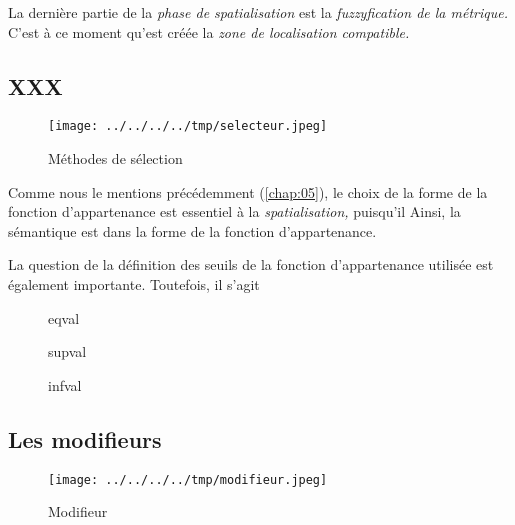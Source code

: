 La dernière partie de la \emph{phase de spatialisation} est la
\emph{fuzzyfication de la métrique.} C'est à ce moment qu'est créée la
\emph{zone de localisation compatible.}

\subsection{XXX}

\begin{figure}
  \centering
  \texttt{[image: ../../../../tmp/selecteur.jpeg]}
  \caption{Méthodes de sélection}
  \label{fig:methode_selecteur}
\end{figure}



%
Comme nous le mentions précédemment (\autoref{chap:05}), le choix de la forme de la fonction d'appartenance est essentiel à la \emph{spatialisation,} puisqu'il
%
Ainsi, la sémantique est dans la forme de la fonction d'appartenance.

%
La question de la définition des seuils de la fonction d'appartenance utilisée est également importante. Toutefois, il s'agit 


\begin{figure}
  \centering
  
  \caption{eqval}
  \label{fig:select_eqval}
\end{figure}


\begin{figure}
  \centering
  
  \caption{supval}
  \label{fig:select_supval}
\end{figure}


\begin{figure}
  \centering
  
  \caption{infval}
  \label{fig:select_infval}
\end{figure}

\subsection{Les modifieurs}



\begin{figure}
  \centering
  \texttt{[image: ../../../../tmp/modifieur.jpeg]}
  \caption{Modifieur}
  \label{fig:methode_modifieur}
\end{figure}



